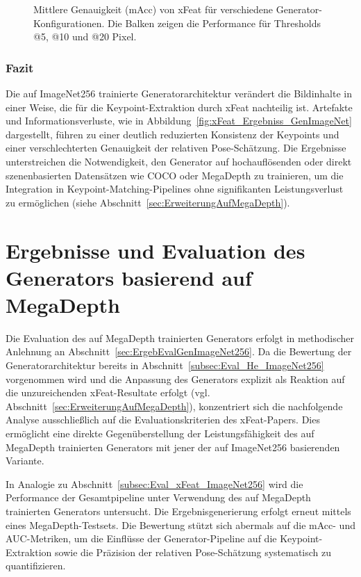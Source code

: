 \begin{figure}[htbp]
    \centering
    
    \caption{Mittlere Genauigkeit (\ac{mAcc}) von \ac{xFeat} für verschiedene Generator-Konfigurationen. Die Balken zeigen die Performance für Thresholds @5, @10 und @20 Pixel.}
    \label{fig:xFeat_ImageNet256_mAcc}
\end{figure}



\subsubsection{Fazit}
Die auf ImageNet256 trainierte Generatorarchitektur verändert die Bildinhalte in einer Weise, die für die Keypoint-Extraktion durch \ac{xFeat} nachteilig ist.
Artefakte und Informationsverluste, wie in Abbildung~\ref{fig:xFeat_Ergebniss_GenImageNet} dargestellt, führen zu einer deutlich reduzierten Konsistenz der Keypoints und einer verschlechterten Genauigkeit der relativen Pose-Schätzung. 
Die Ergebnisse unterstreichen die Notwendigkeit, den Generator auf hochauflösenden oder direkt szenenbasierten Datensätzen wie COCO oder MegaDepth zu trainieren, um die Integration in Keypoint-Matching-Pipelines ohne signifikanten Leistungsverlust zu ermöglichen (siehe Abschnitt~\ref{sec:ErweiterungAufMegaDepth}).









\section{Ergebnisse und Evaluation des Generators basierend auf MegaDepth}
\label{sec:ErgebEvalGenMegaDepth}
Die Evaluation des auf MegaDepth trainierten Generators erfolgt in methodischer Anlehnung an Abschnitt~\ref{sec:ErgebEvalGenImageNet256}. Da die Bewertung der Generatorarchitektur bereits in Abschnitt~\ref{subsec:Eval_He_ImageNet256} vorgenommen wird und die Anpassung des Generators explizit als Reaktion auf die unzureichenden \ac{xFeat}-Resultate erfolgt (vgl. Abschnitt~\ref{sec:ErweiterungAufMegaDepth}), konzentriert sich die nachfolgende Analyse ausschließlich auf die Evaluationskriterien des \ac{xFeat}-Papers. Dies ermöglicht eine direkte Gegenüberstellung der Leistungsfähigkeit des auf MegaDepth trainierten Generators mit jener der auf ImageNet256 basierenden Variante.

In Analogie zu Abschnitt~\ref{subsec:Eval_xFeat_ImageNet256} wird die Performance der Gesamtpipeline unter Verwendung des auf MegaDepth trainierten Generators untersucht. Die Ergebnisgenerierung erfolgt erneut mittels eines MegaDepth-Testsets. Die Bewertung stützt sich abermals auf die \ac{mAcc}- und \ac{AUC}-Metriken, um die Einflüsse der Generator-Pipeline auf die Keypoint-Extraktion sowie die Präzision der relativen Pose-Schätzung systematisch zu quantifizieren.

